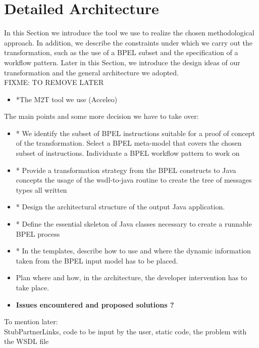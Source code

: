 \section{Detailed Architecture}
\label{DetailedArchitecture}
In this Section we introduce the tool we use to realize the chosen methodological approach. In addition, we describe the constraints under which we carry out the transformation, such as the use of a BPEL subset and the specification of a workflow pattern.
Later in this Section, we introduce the design ideas of our transformation and the general architecture we adopted.\\

FIXME: TO REMOVE LATER
\begin{itemize}
 \item *The M2T tool we use (Acceleo)
\end{itemize}

The main points and some more decision we have to take over:
\begin{itemize}
  \item * We identify the subset of BPEL instructions suitable for a proof of concept of the transformation. 
  \subitem * Select a BPEL meta-model that covers the chosen subset of instructions.
  \subitem * Individuate a BPEL workflow pattern to work on 
 
 \item * Provide a transformation strategy from the BPEL constructs to Java concepts
    \subitem * the usage of the wsdl-to-java routine to create the tree of messages types
    \subitem * all written
 \item * Design the architectural structure of the output Java application.
 \item * Define the essential skeleton of Java classes necessary to create a runnable BPEL process
 \item * In the templates, describe how to use and where the dynamic information taken from the BPEL input model has to be placed.
 \item Plan where and how, in the architecture, the developer intervention has to take place.
 \item \textbf{Issues encountered and proposed solutions  ?}
\end{itemize} 
 
 To mention later: \\
 StubPartnerLinks, code to be input by the user, static code, the problem with the WSDL file

